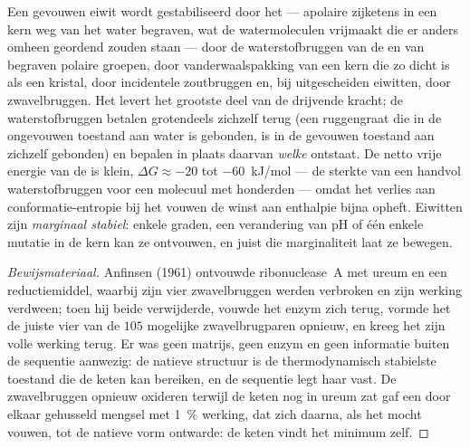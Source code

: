 \begin{proposition}\label{prop:b3:structural-biology:forces}
Een gevouwen eiwit wordt gestabiliseerd door het \emph{} --- apolaire zijketens in een kern weg van het water begraven,
wat de watermoleculen vrijmaakt die er anders omheen geordend zouden
staan --- door de waterstofbruggen van de  en van
begraven polaire groepen, door vanderwaalspakking van een kern die zo
dicht is als een kristal, door incidentele zoutbruggen en, bij
uitgescheiden eiwitten, door zwavelbruggen. Het  levert
het grootste deel van de drijvende kracht; de waterstofbruggen betalen
grotendeels zichzelf terug (een ruggengraat die in de ongevouwen
toestand aan water is gebonden, is in de gevouwen toestand aan zichzelf
gebonden) en bepalen in plaats daarvan \emph{welke}  ontstaat.
De netto vrije energie van de  is klein,
$\Delta G \approx -20$ tot \qty{-60}{kJ/mol} --- de sterkte van een
handvol waterstofbruggen voor een molecuul met honderden --- omdat het
verlies aan conformatie-entropie bij het vouwen de winst aan enthalpie
bijna opheft. Eiwitten zijn \emph{marginaal stabiel}: enkele graden,
een verandering van pH of één enkele mutatie in de kern kan ze
ontvouwen, en juist die marginaliteit laat ze bewegen.
\end{proposition}

\begin{proof}[Bewijsmateriaal]
Anfinsen (1961) ontvouwde ribonuclease~A met ureum en een
reductiemiddel, waarbij zijn vier zwavelbruggen werden verbroken en
zijn werking verdween; toen hij beide verwijderde, vouwde het enzym
zich terug, vormde het de juiste vier van de $105$ mogelijke
zwavelbrugparen opnieuw, en kreeg het zijn volle werking terug. Er was
geen matrijs, geen enzym en geen informatie buiten de sequentie
aanwezig: de natieve structuur is de thermodynamisch stabielste
toestand die de keten kan bereiken, en de sequentie legt haar vast. De
zwavelbruggen opnieuw oxideren terwijl de keten nog in ureum zat gaf
een door elkaar gehusseld mengsel met \qty{1}{\%} werking, dat zich
daarna, als het mocht vouwen, tot de natieve vorm ontwarde: de keten
vindt het minimum zelf.
\end{proof}

